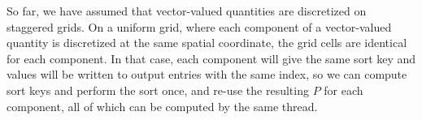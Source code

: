 So far, we have assumed that vector-valued quantities are discretized on
staggered grids. On a uniform grid, where each component of a vector-valued
quantity is discretized at the same spatial coordinate, the grid cells are
identical for each component. In that case, each component will give the same
sort key and values will be written to output entries with the same index, so
we can compute sort keys and perform the sort once, and re-use the resulting
$P$ for each component, all of which can be computed by the same thread.
